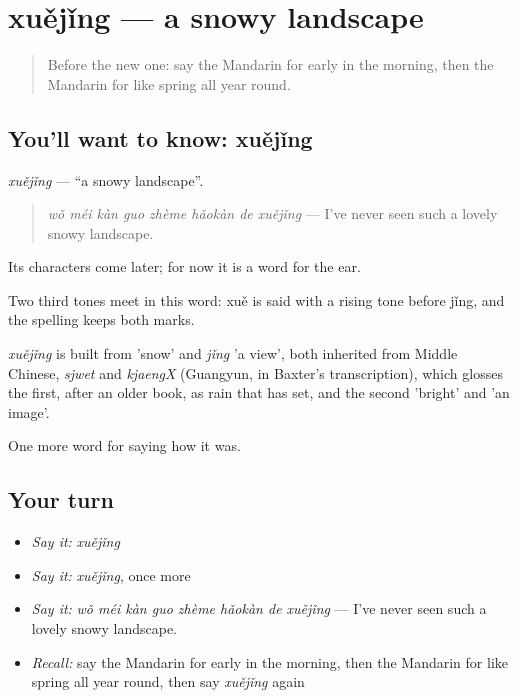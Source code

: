 \section[xuějǐng]{xuějǐng — a snowy landscape}

\label{lesson:ZH-C519-xuejing}



\begin{quote}
Before the new one: say the Mandarin for early in the morning, then the Mandarin for like spring all year round.
\end{quote}

\subsection*{You'll want to know: xuějǐng}
\emph{xuějǐng} — \textquotedblleft{}a snowy landscape\textquotedblright{}.

\begin{quote}
\emph{wǒ méi kàn guo zhème hǎokàn de xuějǐng} — I've never seen such a lovely snowy landscape.
\end{quote}

Its characters come later; for now it is a word for the ear.

Two third tones meet in this word: xuě is said with a rising tone before jǐng, and the spelling keeps both marks.

\begin{cousinweb}
\emph{xuějǐng} is built from  'snow' and \emph{jǐng} 'a view', both inherited from Middle Chinese, \emph{sjwet} and \emph{kjaengX} (Guangyun, in Baxter's transcription), which glosses the first, after an older book, as rain that has set, and the second 'bright' and 'an image'.
\end{cousinweb}

\begin{grammarlens}[title={What you've built}]
One more word for saying how it was.
\end{grammarlens}

\subsection*{Your turn}
\begin{itemize}
\raggedright
  \item \emph{Say it:} \emph{xuějǐng}
  \item \emph{Say it:} \emph{xuějǐng}, once more
  \item \emph{Say it:} \emph{wǒ méi kàn guo zhème hǎokàn de xuějǐng} — I've never seen such a lovely snowy landscape.
  \item \emph{Recall:} say the Mandarin for early in the morning, then the Mandarin for like spring all year round, then say \emph{xuějǐng} again
\end{itemize}

